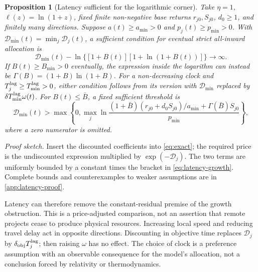 \documentclass[11pt,a4paper]{article}
\newtheorem{proposition}{Proposition}
\theoremstyle{definition}\newtheorem{definition}{Definition}
\begin{document}
\begin{proposition}[Latency sufficient for the logarithmic corner]
\label{prop:latency}
Take $\eta=1$, $\ell(z)=\ln(1+z)$, fixed finite non-negative base returns
$r_{j0},S_{j0}$, $d_0\geq1$, and finitely many directions. Suppose
$a(t)\geq a_{\min}>0$ and $p_j(t)\geq p_{\min}>0$. With
$\mathcal D_{\min}(t)=\min_j\mathcal D_j(t)$, a sufficient condition for eventual strict
all-inward allocation is
\begin{equation}
 \mathcal D_{\min}(t)-\ln\{[1+B(t)][1+\ln(1+B(t))]\}\longrightarrow\infty.
 \label{eq:latency-growth}
\end{equation}
If $B(t)\geq B_{\min}>0$ eventually, the expression inside the logarithm
can instead be $\Gamma(B)=(1+B)\ln(1+B)$. For a non-decreasing clock
and $T_j^{\rm lag}\geq T_{\min}^{\rm lag}>0$, either condition follows
from its version with $\mathcal D_{\min}$ replaced by
$\delta T_{\min}^{\rm lag}\omega(t)$.
For $B(t)\leq\bar B$, a fixed sufficient threshold is
\begin{equation}
 \mathcal D_{\min}(t)>
 \max\left\{0,\max_j\ln\frac{(1+\bar B)(r_{j0}+d_0S_{j0})/a_{\min}
                   +\Gamma(\bar B)S_{j0}}{p_{\min}}\right\},
 \label{eq:latency-bounded}
\end{equation}
where a zero numerator is omitted.
\end{proposition}
\noindent\emph{Proof sketch.}
Insert the discounted coefficients into \cref{eq:exact}; the required
price is the undiscounted expression multiplied by $\exp(-\mathcal D_j)$.
The two terms are uniformly bounded by a constant times the bracket in
\cref{eq:latency-growth}. Complete bounds and counterexamples to weaker
assumptions are in \cref{app:latency-proof}.

Latency can therefore remove the constant-residual premise of the growth
obstruction. This is a price-adjusted comparison, not an assertion that
remote projects cease to produce physical resources. Increasing local
speed and reducing travel delay act in opposite directions. Discounting
in objective time replaces $\mathcal D_j$ by $\delta_{\rm obj}T_j^{\rm lag}$;
then raising $\omega$ has no effect. The choice of clock is a preference
assumption with an observable consequence for the model's allocation,
not a conclusion forced by relativity or thermodynamics.
\end{document}
